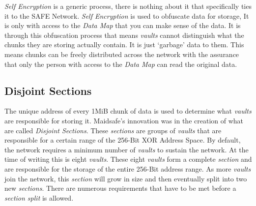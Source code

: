 \textit{Self Encryption} is a generic process, there is nothing about it that specifically ties it to the SAFE Network. \textit{Self Encryption} is used to obfuscate data for storage, It is only with access to the \textit{Data Map} that you can make sense of the data. It is through this obfuscation process that means \textit{vaults} cannot distinguish what the chunks they are storing actually contain. It is just `garbage' data to them. This means chunks can be freely distributed across the network with the assurance that only the person with access to the \textit{Data Map} can read the original data.

\subsection{Disjoint Sections}

The unique address of every 1MiB chunk of data is used to determine what \textit{vaults} are responsible for storing it. Maidsafe's innovation was in the creation of what are called \textit{Disjoint Sections}. These \textit{sections} are groups of \textit{vaults} that are responsible for a certain range of the 256-Bit XOR Address Space. By default, the network requires a minimum number of \textit{vaults} to sustain the network. At the time of writing this is eight \textit{vaults}. These eight \textit{vaults} form a complete \textit{section} and are responsible for the storage of the entire 256-Bit address range. As more \textit{vaults} join the network, this \textit{section} will grow in size and then eventually split into two new \textit{sections}. There are numerous requirements that have to be met before a \textit{section split} is allowed.


